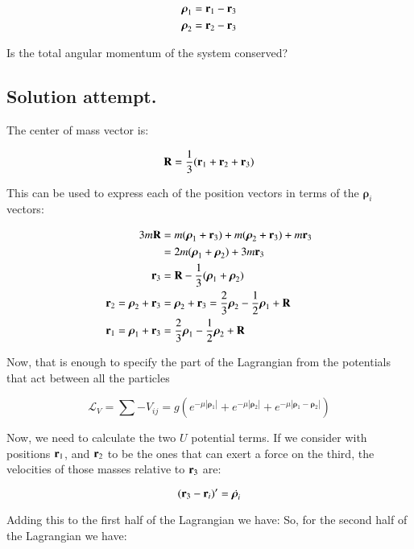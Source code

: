 \documentclass{article}
\newcommand{\Brho}[0]{\boldsymbol{\rho}}
\newcommand{\LL}[0]{\mathcal{L}}
\newcommand{\Abs}[1]{\left\lvert{#1}\right\rvert}
\begin{document}
\begin{align*}
\Brho_1 &= \Br_1 - \Br_3 \\
\Brho_2 &= \Br_2 - \Br_3
\end{align*}

Is the total angular momentum of the system conserved?

\subsection{ Solution attempt. }

The center of mass vector is:

\begin{equation*}
\mathbf{R} = \frac{1}{3}(\mathbf{r}_1 + \mathbf{r}_2 + \mathbf{r}_3)
\end{equation*}

This can be used to express each of the position vectors in terms of the $\Brho_i$ vectors:

\begin{align*}
3 m \BR &= m (\Brho_1 + \Br_3) + m(\Brho_2 + \Br_3) + m \Br_3 \\
        &= 2 m (\Brho_1 + \Brho_2) + 3 m \Br_3 \\
  \Br_3 &= \BR - \inv{3}(\Brho_1 + \Brho_2) \\
\Br_2 = \Brho_2 + \Br_3 &= \Brho_2 + \Br_3 = \frac{2}{3} \Brho_2 - \inv{2} \Brho_1 + \BR \\
\Br_1 = \Brho_1 + \Br_3 &= \frac{2}{3} \Brho_1 - \inv{2} \Brho_2 + \BR \\
\end{align*}

Now, that is enough to specify the part of the Lagrangian from the potentials that act between all the particles

\begin{equation*}
\LL_V = \sum -V_{ij} = g \left( e^{-\mu \Abs{\Brho_1}} + e^{-\mu \Abs{\Brho_2}} + e^{-\mu \Abs{ \Brho_1 - \Brho_2 }} \right)
\end{equation*}

Now, we need to calculate the two $U$ potential terms.  If we consider with positions $\mathbf{r}_1$, and $\mathbf{r}_2$ to be the ones
that can exert a force on the third, the velocities of those masses relative to $\mathbf{r}_3$ are:

\begin{equation*}
(\Br_3 - \Br_i)' = \dot{\Brho_i}
\end{equation*}

Adding this to the first half of the Lagrangian we have:
So, for the second half of the Lagrangian we have:
\end{document}
